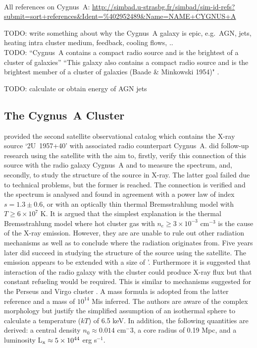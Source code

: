 \documentclass[MScProj_TLRH_ClusterEnergy.tex]{subfiles}
\begin{document}
\\

All references on Cygnus~A: \url{http://simbad.u-strasbg.fr/simbad/sim-id-refs?submit=sort+references&Ident=%402952489&Name=NAME+CYGNUS+A}


TODO: write something about why the Cygnus~A galaxy is epic, e.g.\ AGN, jets, heating intra cluster medium, feedback, cooling flows, .. \\

TODO: ``Cygnus~A contains a compact radio source and is the brightest of a cluster of galaxies'' \citep{1954ApJ...119..206B}
``This galaxy also contains a compact radio source and is the brightest member of a cluster of galaxies (Baade \& Minkowski 1954)" \citep{1979ApJ...230L..67F}.

TODO: calculate or obtain energy of AGN jets \\

\subsection{The Cygnus~A Cluster}
\cite{1972ApJ...178..281G} provided the second  satellite observational catalog which contains the X-ray source `2U~1957+40' with associated radio counterpart Cygnus~A. \citet{1974MNRAS.168..479L} did follow-up research using the  satellite with the aim to, firstly, verify this connection of this source with the radio galaxy Cygnus~A and to measure the spectrum, and, secondly, to study the structure of the source in X-ray. The latter goal failed due to technical problems, but the former is reached. The connection is verified and the spectrum is analysed and found in agreement with a power law of index $s = 1.3 \pm 0.6$, or with an optically thin thermal Bremsstrahlung model with $T \geq 6 \times 10^7$ K. It is argued that the simplest explanation is the thermal Bremsstrahlung model where hot cluster gas with $n_e \geq 3 \times 10^{-3}$ cm$^{-3}$ is the cause of the X-ray emission. However, they are are unable to rule out other radiation mechanisms as well as to conclude where the radiation originates from. Five years later \citet{1979ApJ...230L..67F} did succeed in studying the structure of the source using the  satellite. The emission appears to be extended with a size of '. Furthermore it is suggested that interaction of the radio galaxy with the cluster could produce X-ray flux but that constant refueling would be required. This is similar to mechanisms suggested for the Perseus \citep{1978ApJ...224..718G} and Virgo cluster \citep{1978ApJ...219..413M}. A mass formula is adopted from the latter reference and a mass of $10^{14}$ M\Sun is inferred. The authors are aware of the complex morphology but justify the simplified assumption of an isothermal sphere to calculate a temperature ($kT$) of 6.5 keV. In addition, the following quantities are derived: a central density $n_0 \approx 0.014$ cm${^-3}$, a core radius of 0.19 Mpc, and a luminosity L$_{\rm x} \approx 5 \times 10^{44}$ erg s$^{-1}$.
\end{document}
